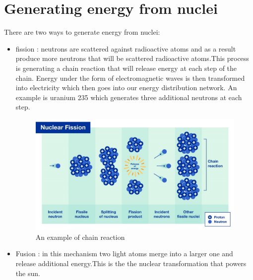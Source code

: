 \documentclass{article}
\begin{document}
\section{Generating energy from nuclei}
There are two ways to generate energy from nuclei:
\begin{itemize}
    \item fission : neutrons are scattered against radioactive atoms and as a result produce more neutrons that will be scattered radioactive atoms.This process is generating a chain reaction that will release energy at each step of the chain. Energy under the form of electromagnetic waves is then transformed into electricity which then goes into our energy distribution network. An example is uranium 235 which generates three additional neutrons at each step.
\begin{figure}
    \centering
    \includegraphics[width=\linewidth]{IAF.jpeg}
    \caption{An example of chain reaction\protect\footnotemark}
    \label{fig:enter-label}
\end{figure}


\item Fusion : in this mechanism two light atoms merge into a larger one and release additional energy.This is the the nuclear transformation that powers the sun.
\end{itemize}
\end{document}
